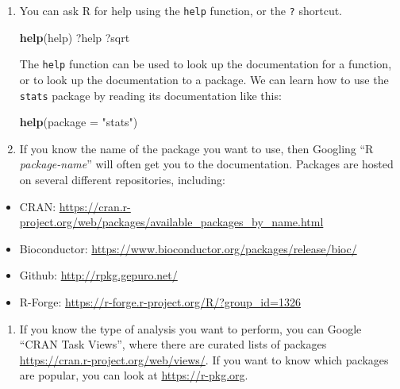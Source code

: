 \documentclass[]{book}
\newenvironment{Shaded}{\begin{snugshade}}{\end{snugshade}}
\newcommand{\KeywordTok}[1]{\textcolor[rgb]{0.13,0.29,0.53}{\textbf{#1}}}
\newcommand{\DataTypeTok}[1]{\textcolor[rgb]{0.13,0.29,0.53}{#1}}
\newcommand{\StringTok}[1]{\textcolor[rgb]{0.31,0.60,0.02}{#1}}
\newcommand{\NormalTok}[1]{#1}
\providecommand{\tightlist}{%
  \setlength{\itemsep}{0pt}\setlength{\parskip}{0pt}}
\begin{document}
\begin{enumerate}
\def\labelenumi{\arabic{enumi}.}
\item
  You can ask R for help using the \texttt{help} function, or the
  \texttt{?} shortcut.

\begin{Shaded}
\begin{Highlighting}[]
\KeywordTok{help}\NormalTok{(help)}
\NormalTok{?help}
\NormalTok{?sqrt}
\end{Highlighting}
\end{Shaded}

  The \texttt{help} function can be used to look up the documentation
  for a function, or to look up the documentation to a package. We can
  learn how to use the \texttt{stats} package by reading its
  documentation like this:

\begin{Shaded}
\begin{Highlighting}[]
   \KeywordTok{help}\NormalTok{(}\DataTypeTok{package =} \StringTok{"stats"}\NormalTok{)}
\end{Highlighting}
\end{Shaded}
\item
  If you know the name of the package you want to use, then Googling ``R
  \emph{package-name}'' will often get you to the documentation.
  Packages are hosted on several different repositories, including:
\end{enumerate}

\begin{itemize}
\tightlist
\item
  CRAN:
  \url{https://cran.r-project.org/web/packages/available_packages_by_name.html}
\item
  Bioconductor:
  \url{https://www.bioconductor.org/packages/release/bioc/}
\item
  Github: \url{http://rpkg.gepuro.net/}
\item
  R-Forge: \url{https://r-forge.r-project.org/R/?group_id=1326}
\end{itemize}

\begin{enumerate}
\def\labelenumi{\arabic{enumi}.}
\setcounter{enumi}{2}
\tightlist
\item
  If you know the type of analysis you want to perform, you can Google
  ``CRAN Task Views'', where there are curated lists of packages
  \url{https://cran.r-project.org/web/views/}. If you want to know which
  packages are popular, you can look at \url{https://r-pkg.org}.
\end{enumerate}
\end{document}
